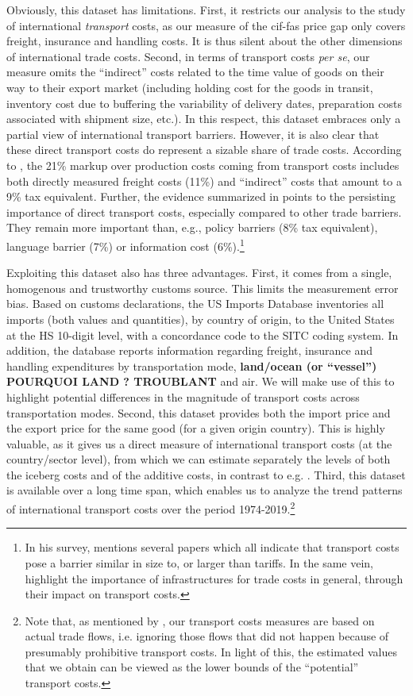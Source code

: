\documentclass[a4paper,11pt]{article}
\begin{document}
Obviously, this dataset has limitations.
First, it restricts our analysis to the study of international \emph{transport} costs, as our measure of the cif-fas price gap only covers freight, insurance and handling costs.
It is thus silent about the other dimensions of international trade costs.
Second, in terms of transport costs \textit{per se}, our measure omits the ``indirect'' costs related to the time value of goods on their way to their export market (including holding cost for the goods in transit, inventory cost due to buffering the variability of delivery dates, preparation costs associated with shipment size, etc.).
In this respect, this dataset embraces only a partial view of international transport barriers.
However, it is also clear that these direct transport costs do represent a sizable share of trade costs.
According to \cite{anderson_wincoop_jel}, the 21\% markup over production costs coming from transport costs includes both directly measured freight costs (11\%) and ``indirect'' costs that amount to a  9\% tax equivalent.
Further, the evidence summarized in \cite{anderson_wincoop_jel} points to the persisting importance of direct transport costs, especially compared to other trade barriers.
They remain more important than, e.g., policy barriers (8\% tax equivalent), language barrier (7\%) or information cost (6\%).\footnote{In his survey, \cite{Hummels_1999} mentions several papers which all indicate that transport costs pose a barrier similar in size to, or larger than tariffs.
In the same vein, \cite{limao_venables} highlight the importance of infrastructures for trade costs in general, through their impact on transport costs.}

Exploiting this dataset also has three advantages.
First, it comes from a single, homogenous and trustworthy customs source.
This limits the measurement error bias.
Based on customs declarations, the US Imports Database inventories all imports (both values and quantities), by country of origin, to the United States at the HS 10-digit level, with a concordance code to the SITC coding system. In addition, the database reports information regarding freight, insurance and handling expenditures by transportation mode, \textbf{land/ocean (or ``vessel'') POURQUOI LAND ? TROUBLANT} and air. We will make use of this to highlight potential differences in the magnitude of transport costs across transportation modes.
Second, this dataset provides both the import price and the export price for the same good (for a given origin country).
This is highly valuable, as it gives us a direct measure of international transport costs (at the country/sector level), from which we can estimate separately the levels of both the iceberg costs and of the additive costs, in contrast to e.g. \cite{Irrazabal_2015}.
Third, this dataset is available over a long time span, which enables us to analyze the trend patterns of international transport costs over the period 1974-2019.\footnote{Note that, as mentioned by \cite{Lafourcade_Thisse}, our transport costs measures are based on actual trade flows, i.e. ignoring those flows that did not happen because of presumably prohibitive transport costs.
In light of this, the estimated values that we obtain can be viewed as the lower bounds of the ``potential'' transport costs.} \smallskip
\end{document}
